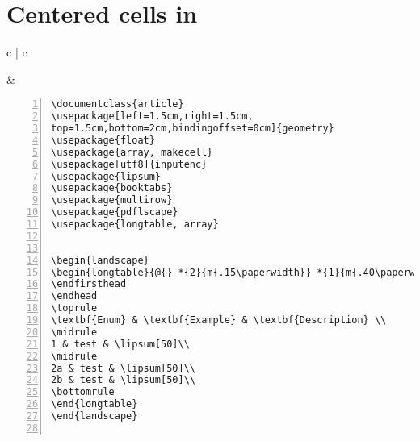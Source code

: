 \section{Centered cells in }
\begin{tabular}{c | c}
\begin{minipage}[m]{0.4\textwidth}
\end{minipage}
&
\begin{minipage}[m]{0.55\textwidth}
\renewcommand\textminus{\mbox{-}}%
\begin{lstlisting}[numberstyle=\zebra{green!15}{yellow!15},numbers=left,basicstyle=\footnotesize] 
\documentclass{article}
\usepackage[left=1.5cm,right=1.5cm,
top=1.5cm,bottom=2cm,bindingoffset=0cm]{geometry}
\usepackage{float}
\usepackage{array, makecell}
\usepackage[utf8]{inputenc}
\usepackage{lipsum}
\usepackage{booktabs}
\usepackage{multirow}
\usepackage{pdflscape}
\usepackage{longtable, array}


\begin{landscape}
\begin{longtable}{@{} *{2}{m{.15\paperwidth}} *{1}{m{.40\paperwidth}} @{}}
\endfirsthead
\endhead
\toprule
\textbf{Enum} & \textbf{Example} & \textbf{Description} \\
\midrule
1 & test & \lipsum[50]\\
\midrule
2a & test & \lipsum[50]\\
2b & test & \lipsum[50]\\
\bottomrule
\end{longtable}
\end{landscape}
          
\end{lstlisting}
\end{minipage}
\end{tabular}

